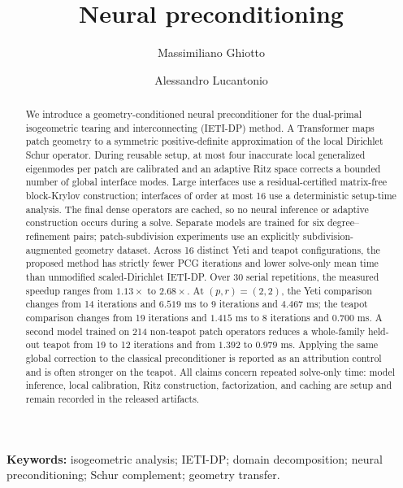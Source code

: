 \documentclass{article}
\title{Neural preconditioning}
\date{}
\author[1]{Massimiliano Ghiotto}
\author[2]{Alessandro Lucantonio}
\affil[1]{Department of Mathematics, University of Pavia}
\affil[2]{Department of Mechanical and Production Engineering, Aarhus University}
\theoremstyle{plain}
\numberwithin{equation}{section}
\begin{document}
\maketitle

\begin{abstract}
    We introduce a geometry-conditioned neural preconditioner for the dual-primal
    isogeometric tearing and interconnecting (IETI-DP) method.  A Transformer maps
    patch geometry to a symmetric positive-definite approximation of the local
    Dirichlet Schur operator.  During reusable setup, at most four inaccurate local
    generalized eigenmodes per patch are calibrated and an adaptive Ritz space
    corrects a bounded number of global interface modes.  Large interfaces use a
    residual-certified matrix-free block-Krylov construction; interfaces of order
    at most 16 use a deterministic setup-time analysis.  The final dense operators
    are cached, so no neural inference
    or adaptive construction occurs during a solve.  Separate models are trained
    for six degree--refinement pairs; patch-subdivision experiments use an
    explicitly subdivision-augmented geometry dataset.  Across 16 distinct Yeti
    and teapot configurations, the proposed method has strictly fewer PCG
    iterations and lower solve-only mean time than unmodified scaled-Dirichlet
    IETI-DP.  Over 30 serial repetitions, the measured speedup ranges from
    $1.13\times$ to $2.68\times$.  At $(p,r)=(2,2)$, the Yeti comparison
    changes from 14 iterations and $6.519$ ms to 9 iterations and $4.467$ ms;
    the teapot comparison changes from 19 iterations and $1.415$ ms to 8
    iterations and $0.700$ ms.  A second model trained on 214 non-teapot patch
    operators reduces a whole-family held-out teapot from 19 to 12 iterations
    and from $1.392$ to $0.979$ ms.  Applying the same global correction to the
    classical preconditioner is reported as an attribution control and is often
    stronger on the teapot.  All claims concern repeated solve-only time: model
    inference, local calibration, Ritz construction, factorization, and caching
    are setup and remain recorded in the released artifacts.
\end{abstract}

\noindent\textbf{Keywords:} isogeometric analysis; IETI-DP; domain
decomposition; neural preconditioning; Schur complement; geometry transfer.

\end{document}
